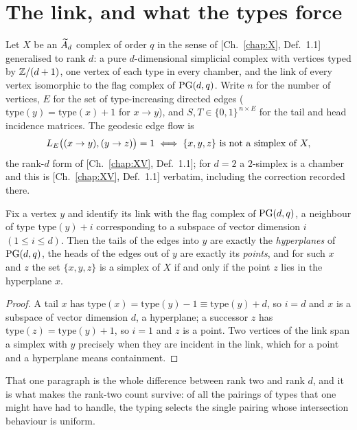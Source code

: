 \section{The link, and what the types force}\label{XVIII:sec:link}

Let $X$ be an $\widetilde A_{d}$ complex of order $q$ in the sense of [Ch.~\ref{chap:X}, Def.~1.1] generalised to
rank $d$: a pure $d$-dimensional simplicial complex with vertices typed by $\mathbb{Z}/(d+1)$,
one vertex of each type in every chamber, and the link of every vertex isomorphic to the
flag complex of $\mathrm{PG}(d,q)$. Write $n$ for the number of vertices, $E$ for the set of
type-increasing directed edges ($\mathrm{type}(y)=\mathrm{type}(x)+1$ for $x\to y$), and
$S,T\in\{0,1\}^{\,n\times E}$ for the tail and head incidence matrices. The geodesic edge
flow is
\[
L_E\bigl((x\to y),(y\to z)\bigr)=1\iff\{x,y,z\}\ \text{is not a simplex of }X,
\]
the rank-$d$ form of [Ch.~\ref{chap:XV}, Def.~1.1]; for $d=2$ a $2$-simplex is a chamber and this is
[Ch.~\ref{chap:XV}, Def.~1.1] verbatim, including the correction recorded there.

\begin{lemma}\label{XVIII:lem:typing}
Fix a vertex $y$ and identify its link with the flag complex of $\mathrm{PG}(d,q)$, a neighbour of
type $\mathrm{type}(y)+i$ corresponding to a subspace of vector dimension $i$
$(1\le i\le d)$. Then the tails of the edges into $y$ are exactly the \emph{hyperplanes}
of $\mathrm{PG}(d,q)$, the heads of the edges out of $y$ are exactly its \emph{points}, and for
such $x$ and $z$ the set $\{x,y,z\}$ is a simplex of $X$ if and only if the point $z$ lies
in the hyperplane $x$.
\end{lemma}

\begin{proof}
A tail $x$ has $\mathrm{type}(x)=\mathrm{type}(y)-1\equiv\mathrm{type}(y)+d$, so $i=d$ and
$x$ is a subspace of vector dimension $d$, a hyperplane; a successor $z$ has
$\mathrm{type}(z)=\mathrm{type}(y)+1$, so $i=1$ and $z$ is a point. Two vertices of the
link span a simplex with $y$ precisely when they are incident in the link, which for a
point and a hyperplane means containment.
\end{proof}

That one paragraph is the whole difference between rank two and rank $d$, and it is what
makes the rank-two count survive: of all the pairings of types that one might have had to
handle, the typing selects the single pairing whose intersection behaviour is uniform.


